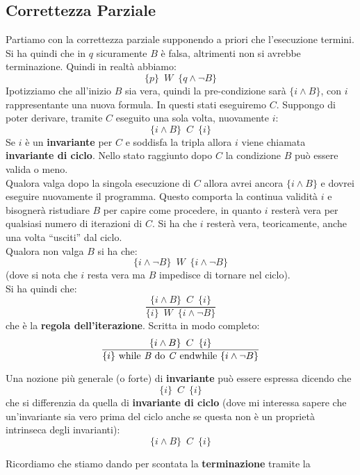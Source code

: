 			\subsection{Correttezza Parziale}
			Partiamo con la correttezza parziale supponendo a priori che l'esecuzione
			termini. Si ha quindi che in $q$ sicuramente $B$ è falsa, altrimenti non si
			avrebbe terminazione. Quindi in realtà abbiamo:
			\[\{p\}\,\,\, W\,\,\,\{q\land \neg B\}\]
			Ipotizziamo che all'inizio $B$ sia vera, quindi la pre-condizione sarà
			$\{i\land B\}$, con $i$ rappresentante una nuova formula. In questi stati
			eseguiremo $C$. Suppongo di poter derivare, tramite $C$ eseguito una sola
			volta, nuovamente $i$:
			\[\{i\land B\}\,\,\, C\,\,\,\{i\}\]
			Se $i$ è un \textbf{invariante} per $C$ e soddisfa la tripla allora $i$ viene chiamata \textbf{invariante di ciclo}. Nello stato raggiunto
			dopo $C$ la condizione $B$ può essere valida o meno. \\ Qualora valga dopo la
			singola esecuzione di $C$ allora avrei ancora $\{i\land B\}$ e dovrei eseguire
			nuovamente il programma. Questo comporta la continua validità $i$ e bisognerà ristudiare $B$
			per capire come procedere, in quanto $i$ resterà vera per qualsiasi numero di
			iterazioni di $C$. Si ha che $i$ resterà vera, teoricamente, anche una volta
			``usciti'' dal ciclo. \\Qualora non valga $B$ si ha che:
			\[\{i\land \neg B\}\,\,\, W\,\,\,\{i\land \neg B\}\]
			(dove si nota che $i$ resta vera ma $B$ impedisce di tornare nel ciclo).\\
			Si ha quindi che:
			\[\frac{\{i\land B\}\,\,\, C\,\,\,\{i\}}{\{i\}\,\,\, W\,\,\,\{i\land \neg B\}}\]
			che è la \textbf{regola dell'iterazione}. Scritta in modo completo:
			\begin{align}\label{IterationRulePartial}
				\frac{\{i\land B\}\,\,\, C\,\,\,\{i\}}{\{i\}\mbox{ while \textit{B} do 
				\textit{C} endwhile }\{i\land \neg B\}}                               
			\end{align}
			\begin{definizione}
				Una nozione più generale (o forte) di \textbf{invariante} può essere espressa dicendo che
				\[\{i\}\,\,\, C\,\,\,\{i\}\]
				che si differenzia da quella di \textbf{invariante di ciclo} (dove mi
				interessa sapere che un'invariante sia vero prima del ciclo anche se questa
				non è un proprietà intrinseca degli invarianti):
				\[\{i\land B\}\,\,\, C\,\,\,\{i\}\]
			\end{definizione}
			Ricordiamo che stiamo dando per scontata la \textbf{terminazione} tramite la
